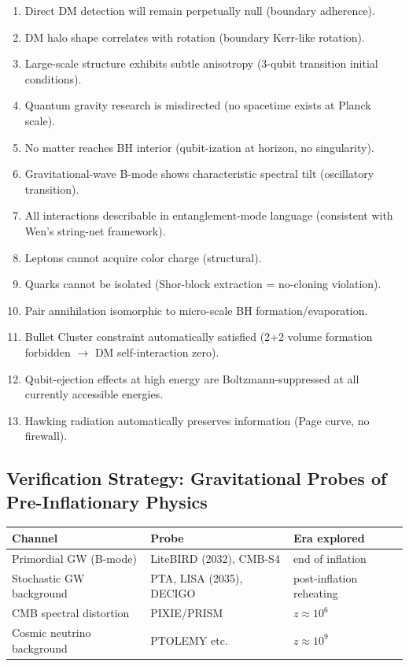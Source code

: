 \documentclass[11pt,a4paper]{article}
\begin{document}
\begin{enumerate}[leftmargin=*]
\item Direct DM detection will remain perpetually null (boundary adherence).
\item DM halo shape correlates with rotation (boundary Kerr-like rotation).
\item Large-scale structure exhibits subtle anisotropy (3-qubit transition initial conditions).
\item Quantum gravity research is misdirected (no spacetime exists at Planck scale).
\item No matter reaches BH interior (qubit-ization at horizon, no singularity).
\item Gravitational-wave B-mode shows characteristic spectral tilt (oscillatory transition).
\item All interactions describable in entanglement-mode language (consistent with Wen's string-net framework).
\item Leptons cannot acquire color charge (structural).
\item Quarks cannot be isolated (Shor-block extraction = no-cloning violation).
\item Pair annihilation isomorphic to micro-scale BH formation/evaporation.
\item Bullet Cluster constraint automatically satisfied (2+2 volume formation forbidden $\to$ DM self-interaction zero).
\item Qubit-ejection effects at high energy are Boltzmann-suppressed at all currently accessible energies.
\item Hawking radiation automatically preserves information (Page curve, no firewall).
\end{enumerate}

\subsection{Verification Strategy: Gravitational Probes of Pre-Inflationary Physics}

\begin{table}[h]
\centering
\begin{tabular}{lll}
\toprule
\textbf{Channel} & \textbf{Probe} & \textbf{Era explored} \\
\midrule
Primordial GW (B-mode) & LiteBIRD (2032), CMB-S4 & end of inflation \\
Stochastic GW background & PTA, LISA (2035), DECIGO & post-inflation reheating \\
CMB spectral distortion & PIXIE/PRISM & $z \approx 10^6$ \\
Cosmic neutrino background & PTOLEMY etc. & $z \approx 10^9$ \\
\bottomrule
\end{tabular}
\end{table}
\end{document}
